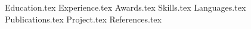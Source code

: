 \documentclass[11pt, a4paper]{awesome-cv}
\newcommand*{\sectiondir}{resume/}
\begin{document}
\makecvheader
\hspace{14.17 cm}


{Education.tex}
\vspace{0.1 cm}
{Experience.tex}
\vspace{0.1 cm}
\newpage
{Awards.tex}
\vspace{0.1 cm}
{Skills.tex}
\vspace{0.1 cm}
{Languages.tex}
\vspace{0.4 cm}
{Publications.tex}
\vspace{0.1 cm}
{Project.tex}
\vspace{0.1 cm}
{References.tex}
\end{document}
